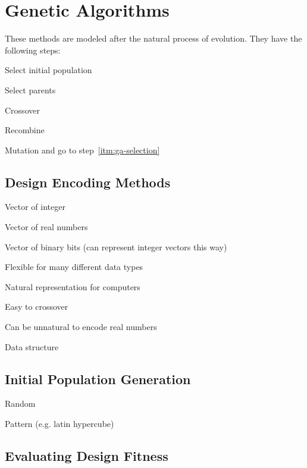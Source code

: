 \documentclass{article}
\begin{document}
\section{Genetic Algorithms}

These methods are modeled after the natural process of evolution. They have the following steps:
\begin{enumerate*}
\item Select initial population
\item \label{itm:ga-selection} Select parents
\item Crossover
\item Recombine
\item Mutation and go to step~\ref{itm:ga-selection}
\end{enumerate*}

\subsection*{Design Encoding Methods}

\begin{itemize*}
\item Vector of integer
\item Vector of real numbers
\item Vector of binary bits (can represent integer vectors this way)
  \begin{itemize*}
  \item Flexible for many different data types
  \item Natural representation for computers
  \item Easy to crossover
  \item Can be unnatural to encode real numbers
  \end{itemize*}
\item Data structure
\end{itemize*}

\subsection*{Initial Population Generation}

\begin{itemize*}
\item Random
\item Pattern (e.g. latin hypercube)
\end{itemize*}

\subsection*{Evaluating Design Fitness}
\end{document}
